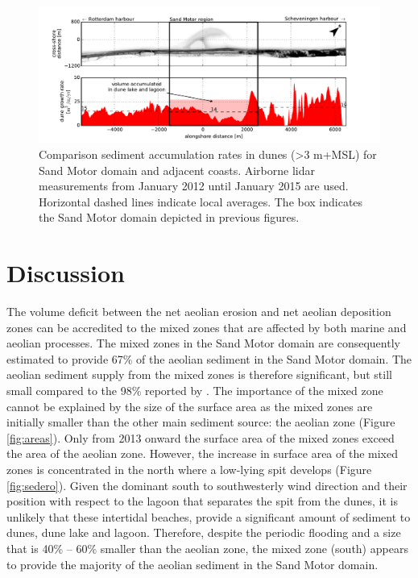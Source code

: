 \begin{figure}
 \centering
  \includegraphics[width=\columnwidth]{../Figures/adjacentcoasts}
  \caption{Comparison sediment accumulation rates in dunes
    (\textgreater 3 m+MSL) for Sand Motor domain and adjacent
    coasts. Airborne lidar measurements from January 2012 until
    January 2015 are used. Horizontal dashed lines indicate local
    averages. The box indicates the Sand Motor domain depicted in
    previous figures.}
  \label{fig:adjacentcoasts}
\end{figure}

\section{Discussion}

The volume deficit between the net aeolian erosion and net aeolian
deposition zones can be accredited to the mixed zones that are
affected by both marine and aeolian processes. The mixed zones in the
Sand Motor domain are consequently estimated to provide 67\% of the
aeolian sediment in the Sand Motor domain. The aeolian sediment supply
from the mixed zones is therefore significant, but still small
compared to the 98\% reported by \citet{Jackson2010}. The importance
of the mixed zone cannot be explained by the size of the surface area
as the mixed zones are initially smaller than the other main sediment
source: the aeolian zone (Figure \ref{fig:areas}). Only from 2013
onward the surface area of the mixed zones exceed the area of the
aeolian zone. However, the increase in surface area of the mixed zones
is concentrated in the north where a low-lying spit develops (Figure
\ref{fig:sedero}). Given the dominant south to southwesterly wind
direction and their position with respect to the lagoon that separates
the spit from the dunes, it is unlikely that these intertidal beaches,
provide a significant amount of sediment to dunes, dune lake and
lagoon. Therefore, despite the periodic flooding and a size that is
40\% -- 60\% smaller than the aeolian zone, the mixed zone (south)
appears to provide the majority of the aeolian sediment in the Sand
Motor domain.

